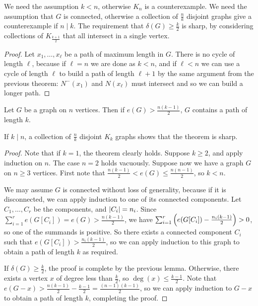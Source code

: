 \begin{remark}
	We need the assumption \( k < n \), otherwise \( K_n \) is a counterexample.
	We need the assumption that \( G \) is connected, otherwise a collection of \( \frac{n}{k} \) disjoint graphs give a counterexample if \( n \mid k \).
	The requirement that \( \delta(G) \geq \frac{k}{2} \) is sharp, by considering collections of \( K_{\frac{k+1}{2}} \) that all intersect in a single vertex.
\end{remark}
\begin{proof}
	Let \( x_1, \dots, x_\ell \) be a path of maximum length in \( G \).
	There is no cycle of length \( \ell \), because if \( \ell = n \) we are done as \( k < n \), and if \( \ell < n \) we can use a cycle of length \( \ell \) to build a path of length \( \ell + 1 \) by the same argument from the previous theorem: \( N^-(x_1) \) and \( N(x_\ell) \) must intersect and so we can build a longer path.
\end{proof}
\begin{theorem}
	Let \( G \) be a graph on \( n \) vertices.
	Then if \( e(G) > \frac{n(k-1)}{2} \), \( G \) contains a path of length \( k \).
\end{theorem}
\begin{remark}
	If \( k \mid n \), a collection of \( \frac{n}{k} \) disjoint \( K_k \) graphs shows that the theorem is sharp.
\end{remark}
\begin{proof}
	Note that if \( k = 1 \), the theorem clearly holds.
	Suppose \( k \geq 2 \), and apply induction on \( n \).
	The case \( n = 2 \) holds vacuously.
	Suppose now we have a graph \( G \) on \( n \geq 3 \) vertices.
	First note that \( \frac{n(k-1)}{2} < e(G) \leq \frac{n(n-1)}{2} \), so \( k < n \).

	We may assume \( G \) is connected without loss of generality, because if it is disconnected, we can apply induction to one of its connected components.
	Let \( C_1, \dots, C_r \) be the components, and \( \abs{C_i} = n_i \).
	Since \( \sum_{i=1}^r e(G[C_i]) = e(G) > \frac{n(k-1)}{2} \), we have \( \sum_{i=1}^r \qty(e(G[C_i]) - \frac{n_i(k - 1)}{2}) > 0 \), so one of the summands is positive.
	So there exists a connected component \( C_i \) such that \( e(G[C_i]) > \frac{n_i(k-1)}{2} \), so we can apply induction to this graph to obtain a path of length \( k \) as required.

	If \( \delta(G) \geq \frac{k}{2} \), the proof is complete by the previous lemma.
	Otherwise, there exists a vertex \( x \) of degree less than \( \frac{k}{2} \), so \( \deg(x) \leq \frac{k-1}{2} \).
	Note that \( e(G - x) > \frac{n(k-1)}{2} - \frac{k-1}{2} = \frac{(n-1)(k-1)}{2} \), so we can apply induction to \( G - x \) to obtain a path of length \( k \), completing the proof.
\end{proof}
